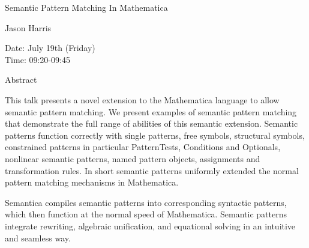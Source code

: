 \begin{center}
\LARGE
Semantic Pattern Matching In Mathematica
\end{center}

\begin{center}
\Large
Jason Harris

\end{center}

\noindent
Date:  July 19th (Friday)\\
Time:  09:20-09:45\\

\begin{center}
\large
Abstract
\end{center}

This talk presents a novel extension to the Mathematica language to allow semantic pattern
matching. We present examples of semantic pattern matching that demonstrate the full range of
abilities of this semantic extension. Semantic patterns function correctly with single patterns, free
symbols, structural symbols, constrained patterns in particular PatternTests, Conditions and
Optionals, nonlinear semantic patterns, named pattern objects, assignments and transformation
rules. In short semantic patterns uniformly extended the normal pattern matching mechanisms in
Mathematica. 

Semantica compiles semantic patterns into corresponding syntactic patterns, which then function
at the normal speed of Mathematica. Semantic patterns integrate rewriting, algebraic unification,
and equational solving in an intuitive and seamless way. 

